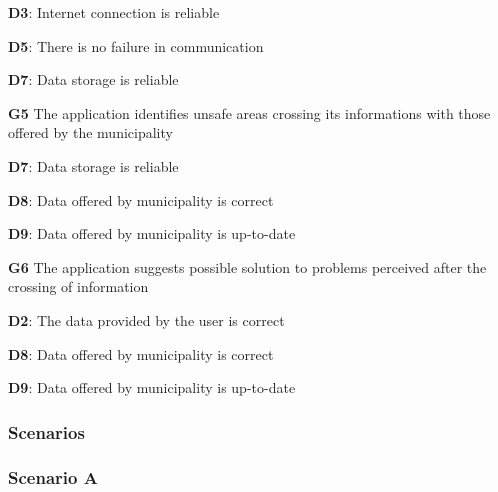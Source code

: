\begin{outline}
\2 \textbf{D3}: Internet connection is reliable

\2 \textbf{D5}: There is no failure in communication

\2 \textbf{D7}: Data storage is reliable


\1  \textbf{G5} The application identifies unsafe areas crossing its informations with those offered by the municipality

\2 \textbf{D7}: Data storage is reliable

\2 \textbf{D8}: Data offered by municipality is correct

\2 \textbf{D9}: Data offered by municipality is up-to-date



\1  \textbf{G6} The application suggests possible solution to problems perceived after the crossing of information

\2 \textbf{D2}: The data provided by the user is correct

\2 \textbf{D8}: Data offered by municipality is correct

\2 \textbf{D9}: Data offered by municipality is up-to-date

\end{outline}


\subsubsection{Scenarios}

\subsubsection*{Scenario A}

